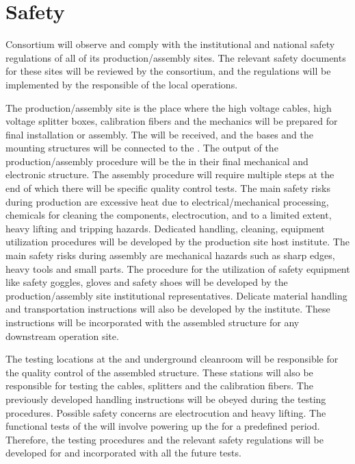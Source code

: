 \section{Safety}
\label{sec:dp-pds-safety}

\dual {} Consortium will observe and comply with the institutional and national safety regulations of all of its production/assembly sites. The relevant safety documents for these sites will be reviewed by the consortium, and the regulations will be implemented by the responsible of the local operations.

The production/assembly site is the place where the high voltage cables, high voltage splitter boxes, calibration fibers and the  mechanics will be prepared for final installation or assembly. The  will be received, and the bases and the mounting structures will be connected to the . The output of the production/assembly procedure will be the  in their final mechanical and electronic structure. The assembly procedure will require multiple steps at the end of which there will be specific quality control tests. The main safety risks during production are excessive heat due to electrical/mechanical processing, chemicals for cleaning the components, electrocution, and to a limited extent, heavy lifting and tripping hazards. Dedicated handling, cleaning, equipment utilization procedures will be developed by the production site host institute. The main safety risks during assembly are mechanical hazards such as sharp edges, heavy tools and small parts. The procedure for the utilization of safety equipment like safety goggles, gloves and safety shoes will be developed by the production/assembly site institutional representatives. Delicate material handling and transportation instructions will also be developed by the institute. These instructions will be incorporated with the assembled structure for any downstream operation site.

The testing locations at the  and underground cleanroom  will be responsible for the quality control of the assembled  structure. These stations will also be responsible for testing the  cables,  splitters and the calibration fibers. The previously developed handling instructions will be obeyed during the testing procedures. Possible safety concerns are electrocution and heavy lifting. The functional tests of the  will involve powering up the  for a predefined period. Therefore, the testing procedures and the relevant safety regulations will be developed for and incorporated with all the future  tests.

